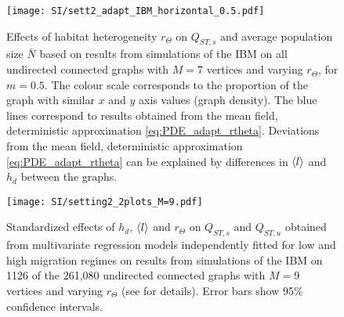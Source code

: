 \begin{figure}[t]
  \centerline{
      \texttt{[image: SI/sett2\_adapt\_IBM\_horizontal\_0.5.pdf]} 
  }
  \caption{ Effects of habitat heterogeneity $r_\Theta$ on $Q_{ST,s}$ and average population size $\bar{N}$ based on results from simulations of the IBM on all undirected connected graphs with $M=7$ vertices and varying $r_\Theta$, for $m = 0.5$. The colour scale corresponds to the proportion of the graph with similar $x$ and $y$ axis values (graph density). The blue lines correspond to results obtained from the mean field, deterministic approximation \cref{eq:PDE_adapt_rtheta}. Deviations from the mean field, deterministic approximation \cref{eq:PDE_adapt_rtheta} can be explained by differences in $\langle l \rangle$ and $h_d$ between the graphs.}
  \label{figSI:sett2_adapt_IBM_horizontal_0.5}
\end{figure}
\FloatBarrier


\begin{figure}[t]
  \centerline{
      \texttt{[image: SI/setting2\_2plots\_M=9.pdf]} 
  }
  \caption{Standardized effects of $h_d$, $\langle l \rangle$ and $r_\Theta$ on $Q_{ST,s}$ and $Q_{ST,u}$ obtained from multivariate regression models independently fitted for low and high migration regimes on results from simulations of the IBM on 1126 of the 261,080 undirected connected graphs with $M=9$ vertices and varying $r_\Theta$ (see  for details). Error bars show 95\% confidence intervals.
}
  \label{figSI:setting2_2plots_M=9}
\end{figure}
\FloatBarrier

